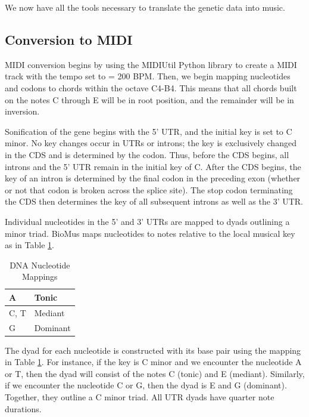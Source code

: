 \documentclass[letterpaper]{article}
\begin{document}
We now have all the tools necessary to translate the genetic data into music.

\subsection{Conversion to MIDI}

MIDI conversion begins by using the MIDIUtil Python library to create a MIDI track with the tempo set to \musQuarter\; = 200 BPM. Then, we begin mapping nucleotides and codons to chords within the octave C4-B4. This means that all chords built on the notes C through E will be in root position, and the remainder will be in inversion.

Sonification of the gene begins with the 5’ UTR, and the initial key is set to C minor. No key changes occur in UTRs or introns; the key is exclusively changed in the CDS and is determined by the codon. Thus, before the CDS begins, all introns and the 5’ UTR remain in the initial key of C. After the CDS begins, the key of an intron is determined by the final codon in the preceding exon (whether or not that codon is broken across the splice site). The stop codon terminating the CDS then determines the key of all subsequent introns as well as the 3’ UTR.


Individual nucleotides in the 5’ and 3’ UTRs are mapped to dyads outlining a minor triad. BioMus maps nucleotides to notes relative to the local musical key as in Table \ref{table:nucleotides}.

\begin{table}[h!]
\centering
\vspace{-2mm}
\begin{tabular}{|l|l|}
\hline
A   & Tonic    \\ \hline
C, T & Mediant  \\ \hline
G   & Dominant \\ \hline
\end{tabular}
\caption{DNA Nucleotide Mappings}
\vspace{-3mm}
\label{table:nucleotides}
\end{table}

The dyad for each nucleotide is constructed with its base pair using the mapping in Table \ref{table:nucleotides}. For instance, if the key is C minor and we encounter the nucleotide A or T, then the dyad will consist of the notes C (tonic) and E\musFlat\; (mediant). Similarly, if we encounter the nucleotide C or G, then the dyad is E\musFlat \; and G (dominant). Together, they outline a C minor triad. All UTR dyads have quarter note durations.
\end{document}
